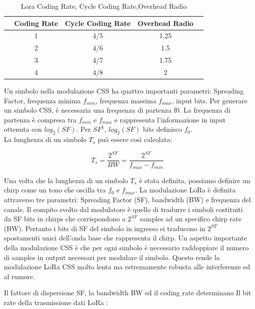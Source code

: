 \documentclass[12pt,a4paper,openright,twoside]{report}
\begin{document}
\begin{table}[h]
\begin{center} 
\begin{tabular}{lcccc}
&Coding Rate&Cycle Coding Rate&Overhead Radio\\ \hline\hline
&1&4/5&1.25\\
\hline
&2&4/6&1.5\\
\hline
&3&4/7&1.75\\
\hline
&4&4/8&2\\
\hline
\end{tabular}
\caption[Lora Coding Rate, Cycle Coding Rate,Overhead Radio]{Lora Coding Rate, Cycle Coding Rate,Overhead Radio}\label{tab:tre}
\end{center}
\end{table}


 Un simbolo nella modulazione CSS ha quattro importanti parametri: Spreading Factor, frequenza minima $f_{min}$, frequenza massima $f_{max}$, input bits. Per generare un simbolo CSS, \`e necessaria una frequenza di partenza f0. La frequenza di partenza  \`e compresa tra $f_{min}$ e $f_{max}$ e rappresenta l'informazione in input ottenuta con $log_2(SF)$. Per $SF^1$,  $log_2(SF)$ bits definisco  $f_0$. 
 \\La lunghezza di un simbolo $T_s$ pu\`o essere cos\`i calcolata:
 
 
\begin{equation*} T_s = \frac{2^{SF}}{BW} = \frac{2^{SF}}{f_{max}-f_{min}}\end{equation*}

Una volta che  la lunghezza di un simbolo $T_s$ \`e stata definita, possiamo definire un chirp come un tono che oscilla tra $f_0$ e $f_{max}$.
La modulazione LoRa \`e definita attraverso tre parametri: Spreading Factor (SF), bandwidth (BW) e frequenza del canale. Il compito svolto dal modulatore \`e quello di tradurre i simboli costituiti da SF bits in chirps che corrispondono a $2^{SF}$ samples ad un specifico chirp rate (BW).  Pertanto i bits di SF del simbolo in ingresso si traducono in $2^{SF}$ spostamenti unici dell'onda base che rappresenta il chirp.
Un aspetto importante della modulazione CSS \`e che per ogni simbolo \`e necessario raddoppiare il numero di samples in output necessari per modulare il simbolo. Questo rende la modulazione LoRa CSS molto lenta ma estremamente robusta alle interferenze ed al rumore. 

Il fattore di dispersione SF, la bandwidth BW ed il coding rate determinano Il bit rate della trasmissione dati LoRa :
\end{document}
